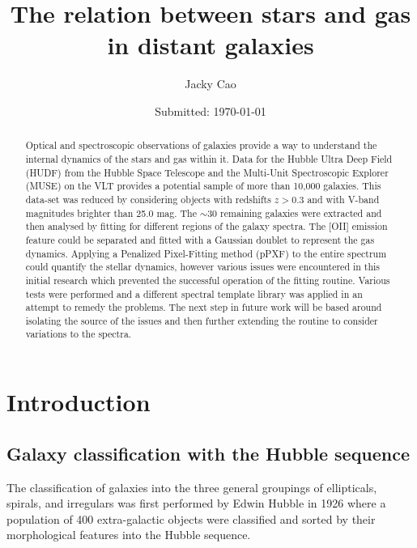 \documentclass[12pt, twocolumn]{revtex4}    %
\begin{document}
                     

\title{The relation between stars and gas in distant galaxies} 
\date{Submitted: \today{}}
\author{Jacky Cao}

\begin{abstract}              

Optical and spectroscopic observations of galaxies provide a way to understand the internal dynamics of the stars and gas within it. Data for the Hubble Ultra Deep Field (HUDF) from the Hubble Space Telescope and the Multi-Unit Spectroscopic Explorer (MUSE) on the VLT provides a potential sample of more than 10,000 galaxies. This data-set was reduced by considering objects with redshifts $z>0.3$ and with V-band magnitudes brighter than 25.0 mag. The $\sim30$ remaining galaxies were extracted and then analysed by fitting for different regions of the galaxy spectra. The [OII] emission feature could be separated and fitted with a Gaussian doublet to represent the gas dynamics. Applying a Penalized Pixel-Fitting method (pPXF) to the entire spectrum could quantify the stellar dynamics, however various issues were encountered in this initial research which prevented the successful operation of the fitting routine. Various tests were performed and a different spectral template library was applied in an attempt to remedy the problems. The next step in future work will be based around isolating the source of the issues and then further extending the routine to consider variations to the spectra.

\end{abstract}

\maketitle

\tableofcontents

\clearpage

\section{Introduction} 

\subsection{Galaxy classification with the Hubble sequence}
The classification of galaxies into the three general groupings of ellipticals, spirals, and irregulars was first performed by Edwin Hubble in 1926 \citep{1926ApJ....64..321H} where a population of 400 extra-galactic objects were classified and sorted by their morphological features into the Hubble sequence.
\end{document}
